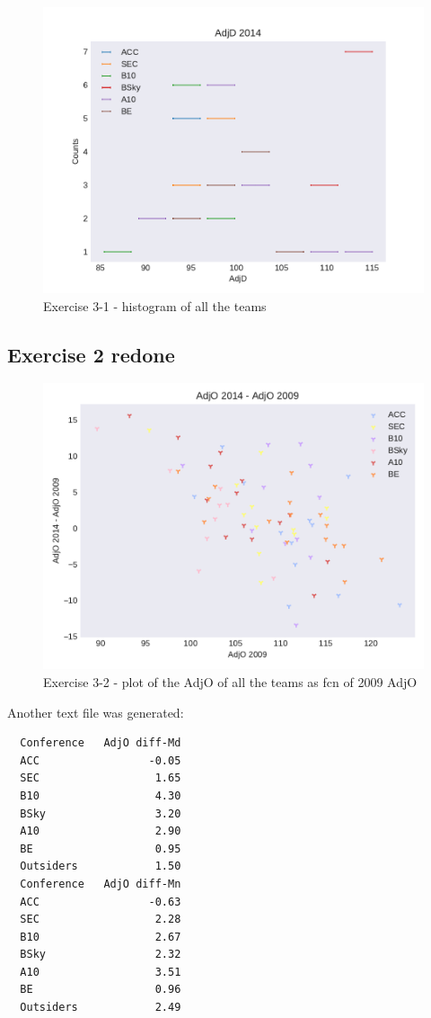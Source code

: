 \documentclass[a4paper,11pt]{article}
\begin{document}
\begin{figure}[ht!]
  \includegraphics[width=\linewidth]{../plots/Exc31.pdf}
  \caption{Exercise 3-1 - histogram of all the teams}
  \label{exc31}
\end{figure}

\subsection{Exercise 2 redone}


\begin{figure}[ht!]
  \includegraphics[width=\linewidth]{../plots/Exc32.pdf}
  \caption{Exercise 3-2 - plot of the AdjO of all the teams as fcn of 2009 AdjO}
  \label{exc2}
\end{figure}

Another text file was generated:

\begin{verbatim}
  Conference   AdjO diff-Md
  ACC                 -0.05
  SEC                  1.65
  B10                  4.30
  BSky                 3.20
  A10                  2.90
  BE                   0.95
  Outsiders            1.50
  Conference   AdjO diff-Mn
  ACC                 -0.63
  SEC                  2.28
  B10                  2.67
  BSky                 2.32
  A10                  3.51
  BE                   0.96
  Outsiders            2.49
\end{verbatim}
\end{document}
